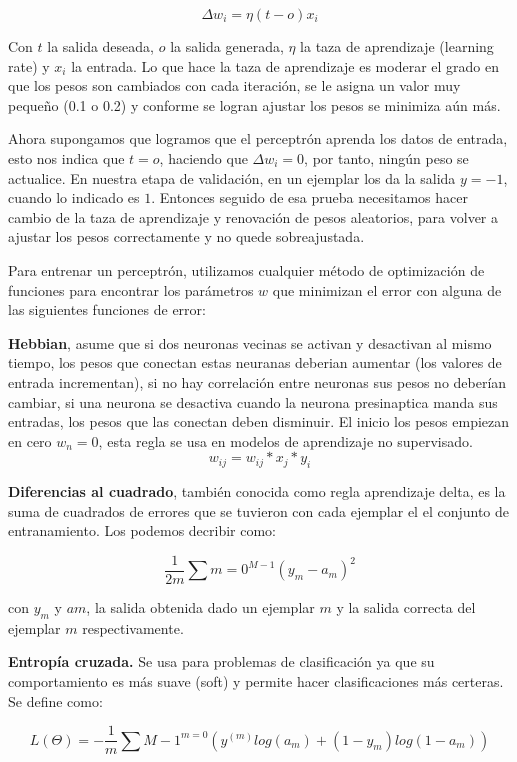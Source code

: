 \begin{equation}
 \Delta w_{i} = \eta(t - o)x_{i}
\end{equation}

 
Con $t$ la salida deseada, $o$ la salida generada, $\eta$ la taza de aprendizaje (learning rate) y $x_{i}$ la entrada. Lo que hace la taza de aprendizaje es moderar el grado en que los pesos son cambiados con cada iteración, se le asigna un valor muy pequeño (0.1 o 0.2) y conforme se logran ajustar los pesos se minimiza aún más. 


Ahora supongamos que logramos que el perceptrón aprenda los datos de entrada, esto nos indica que $t = o$, haciendo que \(\Delta w_{i} = 0\), por tanto, ningún peso se actualice. En nuestra etapa de validación, en un ejemplar los da la salida $y = -1$, cuando lo indicado es $1$. Entonces seguido de esa prueba necesitamos hacer cambio de la taza de aprendizaje y renovación de pesos aleatorios, para volver a ajustar los pesos correctamente y no quede sobreajustada.


Para entrenar un perceptrón, utilizamos cualquier método de optimización de funciones para encontrar los parámetros $w$ que minimizan el error con alguna de las siguientes funciones de error:

\begin{description}
 \item \textbf{Hebbian}, asume que si dos neuronas vecinas se activan y desactivan al mismo tiempo, los pesos que conectan estas neuranas deberian aumentar (los valores de entrada incrementan), si no hay correlación entre neuronas sus pesos no deberían cambiar, si una neurona se desactiva cuando la neurona presinaptica manda sus entradas, los pesos que las conectan deben disminuir. El inicio los pesos empiezan en cero $w_{n} = 0$, esta regla se usa en modelos de aprendizaje no supervisado. \[w_{ij} = w_{ij} * x_{j} * y_{i}\]   
 \item \textbf{Diferencias al cuadrado}, también conocida como regla aprendizaje delta, es la suma de cuadrados de errores que se tuvieron con cada ejemplar el el conjunto de entranamiento. Los podemos decribir como: 
 
 \begin{equation}
   \dfrac{1}{2m}\sum{m=0}^{M-1} (y_{m} - a_{m})^2
 \end{equation}
 
 con $y_{m}$ y $a{m}$, la salida obtenida dado un ejemplar $m$ y la salida correcta del ejemplar $m$ respectivamente.
 
 \item \textbf{Entropía cruzada.} Se usa para problemas de clasificación ya que su comportamiento es más suave (soft) y permite hacer clasificaciones más certeras. Se define como:

 \begin{equation}
  L (\Theta) = -\dfrac{1}{m}\sum{M-1}^{m=0}(y^(m)log(a_{m}) + (1-y_{m}) log(1-a_{m})) 
 \end{equation}

\end{description}

